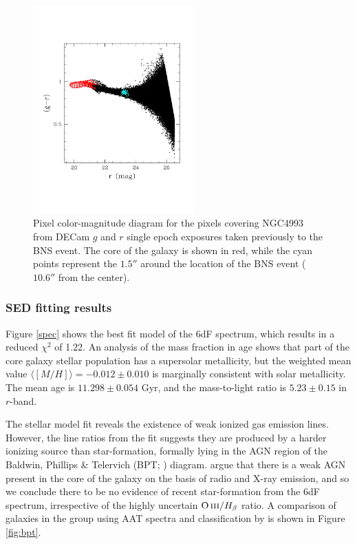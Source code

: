 \begin{figure}
\centering
\includegraphics[width=0.55\textwidth]{./chapters/chapter3/Figures/f4b.pdf}
\caption{Pixel color-magnitude diagram for the pixels covering NGC4993 from DECam $g$ and $r$ single epoch exposures taken previously to the BNS event. The core of the galaxy is shown in red, while the cyan points represent the $1.5''$ around the location of the BNS event ($10.6''$ from the center).}\label{fig:pcmd}\end{figure}


\subsubsection{SED fitting results}\label{resultssec}
Figure \ref{spec} shows the best fit model of the 6dF spectrum, which results in a reduced $\chi^2$ of 1.22. An analysis of the mass fraction in age shows that part of the core galaxy stellar population has a supersolar metallicity, but the weighted mean value $\langle [M/H]\rangle=-0.012\pm 0.010$ is marginally consistent with solar metallicity. The mean age is $11.298\pm 0.054$ Gyr, and the mass-to-light ratio is $5.23\pm 0.15$ in $r$-band.

The stellar model fit reveals the existence of weak ionized gas emission lines. However, the line ratios from the fit suggests they are produced by a harder ionizing source than star-formation, formally lying in the AGN region of the Baldwin, Phillips \& Telervich (BPT; \citealt{BPTref}) diagram. \citet{blanchard} argue that there is a weak AGN present in the core of the galaxy on the basis of radio and X-ray emission, and so we conclude there to be no evidence of recent star-formation from the 6dF spectrum, irrespective of the highly uncertain ${\rm O\,\textsc{iii}}/H_\beta$ ratio. A comparison of galaxies in the group using AAT spectra and classification by \citet{2006MNRAS.372..961K} is shown in Figure \ref{fig:bpt}.

